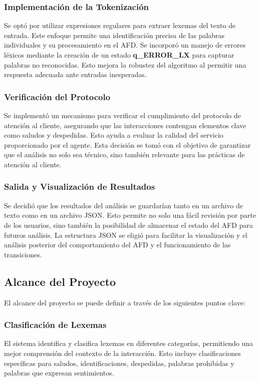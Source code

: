 \documentclass[12pt,a4paper]{article}
\begin{document}
\subsubsection{Implementación de la Tokenización}
Se optó por utilizar expresiones regulares para extraer lexemas del texto de entrada. Este
enfoque permite una identificación precisa de las palabras individuales y su procesamiento en
el AFD. Se incorporó un manejo de errores léxicos mediante la creación de un estado
\textbf{q\_ERROR\_LX} para capturar palabras no reconocidas. Esto mejora la robustez del
algoritmo al permitir una respuesta adecuada ante entradas inesperadas.

\subsubsection{Verificación del Protocolo}
Se implementó un mecanismo para verificar el cumplimiento del protocolo de atención al cliente,
asegurando que las interacciones contengan elementos clave como saludos y despedidas. Esto
ayuda a evaluar la calidad del servicio proporcionado por el agente. Esta decisión se tomó con
el objetivo de garantizar que el análisis no solo sea técnico, sino también relevante para las
prácticas de atención al cliente.

\subsubsection{Salida y Visualización de Resultados}
Se decidió que los resultados del análisis se guardarían tanto en un archivo de texto como en
un archivo JSON. Esto permite no solo una fácil revisión por parte de los usuarios, sino
también la posibilidad de almacenar el estado del AFD para futuros análisis. La estructura JSON
se eligió para facilitar la visualización y el análisis posterior del comportamiento del AFD y
el funcionamiento de las transiciones.

\subsection{Alcance del Proyecto}
El alcance del proyecto se puede definir a través de los siguientes puntos clave:

\subsubsection{Clasificación de Lexemas}
El sistema identifica y clasifica lexemas en diferentes categorías, permitiendo una mejor
comprensión del contexto de la interacción. Esto incluye clasificaciones específicas para
saludos, identificaciones, despedidas, palabras prohibidas y palabras que expresan
sentimientos.
\end{document}
